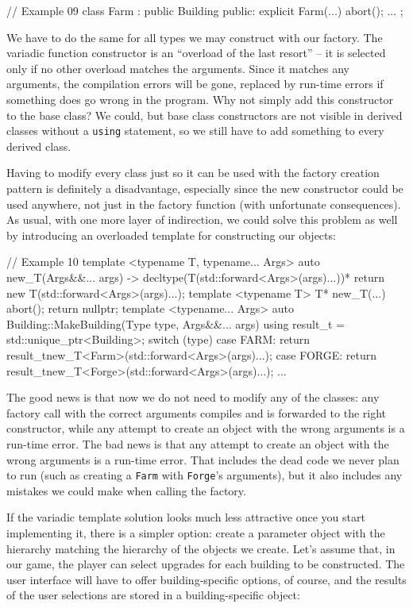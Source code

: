 \begin{code}
// Example 09
class Farm : public Building {
  public:
  explicit Farm(...) { abort(); }
  ...
};
\end{code}

We have to do the same for all types we may construct with our factory. The variadic function constructor is an ``overload of the last resort'' -- it is selected only if no other overload matches the arguments. Since it matches any arguments, the compilation errors will be gone, replaced by run-time errors if something does go wrong in the program. Why not simply add this constructor to the base class? We could, but base class constructors are not visible in derived classes without a \texttt{using} statement, so we still have to add something to every derived class.

Having to modify every class just so it can be used with the factory creation pattern is definitely a disadvantage, especially since the new constructor could be used anywhere, not just in the factory function (with unfortunate consequences). As usual, with one more layer of indirection, we could solve this problem as well by introducing an overloaded template for constructing our objects:

\begin{code}
// Example 10
template <typename T, typename... Args>
auto new_T(Args&&... args) ->
  decltype(T(std::forward<Args>(args)...))* {
  return new T(std::forward<Args>(args)...);
}
template <typename T>
T* new_T(...) { abort(); return nullptr; }
template <typename... Args>
auto Building::MakeBuilding(Type type, Args&&... args) {
  using result_t = std::unique_ptr<Building>;
  switch (type) {
    case FARM: return
      result_t{new_T<Farm>(std::forward<Args>(args)...)};
    case FORGE: return
      result_t{new_T<Forge>(std::forward<Args>(args)...)};
    ...
  }
}
\end{code}

The good news is that now we do not need to modify any of the classes: any factory call with the correct arguments compiles and is forwarded to the right constructor, while any attempt to create an object with the wrong arguments is a run-time error. The bad news is that any attempt to create an object with the wrong arguments is a run-time error. That includes the dead code we never plan to run (such as creating a \texttt{Farm} with \texttt{Forge}'s arguments), but it also includes any mistakes we could make when calling the factory.

If the variadic template solution looks much less attractive once you start implementing it, there is a simpler option: create a parameter object with the hierarchy matching the hierarchy of the objects we create. Let's assume that, in our game, the player can select upgrades for each building to be constructed. The user interface will have to offer building-specific options, of course, and the results of the user selections are stored in a building-specific object:

